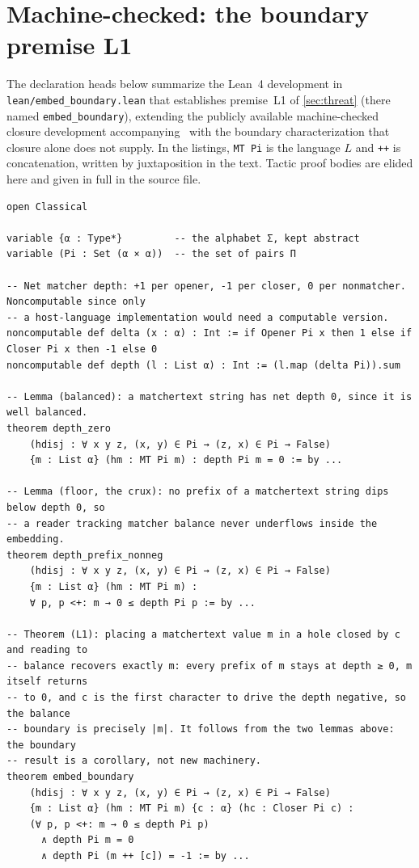 \section{Machine-checked: the boundary premise L1}
\label{sec:appendix:lean}

The declaration heads below summarize the Lean~4 development in
\texttt{lean/embed\_boundary.lean} that establishes premise~L1 of \cref{sec:threat} (there
named \texttt{embed\_boundary}), extending the publicly available machine-checked
closure development accompanying~\cite{matchertext} with the boundary
characterization that closure alone does not supply.
In the listings, \texttt{MT Pi} is the language $L$ and \texttt{++} is
concatenation, written by juxtaposition in the text.
Tactic proof bodies are elided here and given in full in the source file.

\begin{lstlisting}
open Classical

variable {α : Type*}         -- the alphabet Σ, kept abstract
variable (Pi : Set (α × α))  -- the set of pairs Π

-- Net matcher depth: +1 per opener, -1 per closer, 0 per nonmatcher. Noncomputable since only
-- a host-language implementation would need a computable version.
noncomputable def delta (x : α) : Int := if Opener Pi x then 1 else if Closer Pi x then -1 else 0
noncomputable def depth (l : List α) : Int := (l.map (delta Pi)).sum

-- Lemma (balanced): a matchertext string has net depth 0, since it is well balanced.
theorem depth_zero
    (hdisj : ∀ x y z, (x, y) ∈ Pi → (z, x) ∈ Pi → False)
    {m : List α} (hm : MT Pi m) : depth Pi m = 0 := by ...

-- Lemma (floor, the crux): no prefix of a matchertext string dips below depth 0, so
-- a reader tracking matcher balance never underflows inside the embedding.
theorem depth_prefix_nonneg
    (hdisj : ∀ x y z, (x, y) ∈ Pi → (z, x) ∈ Pi → False)
    {m : List α} (hm : MT Pi m) :
    ∀ p, p <+: m → 0 ≤ depth Pi p := by ...

-- Theorem (L1): placing a matchertext value m in a hole closed by c and reading to
-- balance recovers exactly m: every prefix of m stays at depth ≥ 0, m itself returns
-- to 0, and c is the first character to drive the depth negative, so the balance
-- boundary is precisely |m|. It follows from the two lemmas above: the boundary
-- result is a corollary, not new machinery.
theorem embed_boundary
    (hdisj : ∀ x y z, (x, y) ∈ Pi → (z, x) ∈ Pi → False)
    {m : List α} (hm : MT Pi m) {c : α} (hc : Closer Pi c) :
    (∀ p, p <+: m → 0 ≤ depth Pi p)
      ∧ depth Pi m = 0
      ∧ depth Pi (m ++ [c]) = -1 := by ...
\end{lstlisting}